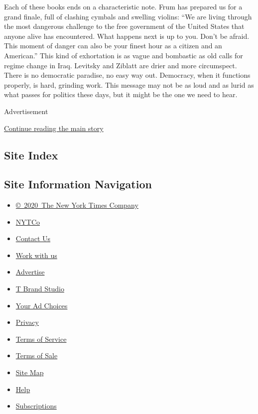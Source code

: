 Each of these books ends on a characteristic note. Frum has prepared us
for a grand finale, full of clashing cymbals and swelling violins: ``We
are living through the most dangerous challenge to the free government
of the United States that anyone alive has encountered. What happens
next is up to you. Don't be afraid. This moment of danger can also be
your finest hour as a citizen and an American.'' This kind of
exhortation is as vague and bombastic as old calls for regime change in
Iraq. Levitsky and Ziblatt are drier and more circumspect. There is no
democratic paradise, no easy way out. Democracy, when it functions
properly, is hard, grinding work. This message may not be as loud and as
lurid as what passes for politics these days, but it might be the one we
need to hear.

Advertisement

\protect\hyperlink{after-bottom}{Continue reading the main story}

\hypertarget{site-index}{%
\subsection{Site Index}\label{site-index}}

\hypertarget{site-information-navigation}{%
\subsection{Site Information
Navigation}\label{site-information-navigation}}

\begin{itemize}
\tightlist
\item
  \href{https://help.nytimes.com/hc/en-us/articles/115014792127-Copyright-notice}{©~2020~The
  New York Times Company}
\end{itemize}

\begin{itemize}
\tightlist
\item
  \href{https://www.nytco.com/}{NYTCo}
\item
  \href{https://help.nytimes.com/hc/en-us/articles/115015385887-Contact-Us}{Contact
  Us}
\item
  \href{https://www.nytco.com/careers/}{Work with us}
\item
  \href{https://nytmediakit.com/}{Advertise}
\item
  \href{http://www.tbrandstudio.com/}{T Brand Studio}
\item
  \href{https://www.nytimes.com/privacy/cookie-policy\#how-do-i-manage-trackers}{Your
  Ad Choices}
\item
  \href{https://www.nytimes.com/privacy}{Privacy}
\item
  \href{https://help.nytimes.com/hc/en-us/articles/115014893428-Terms-of-service}{Terms
  of Service}
\item
  \href{https://help.nytimes.com/hc/en-us/articles/115014893968-Terms-of-sale}{Terms
  of Sale}
\item
  \href{https://spiderbites.nytimes.com}{Site Map}
\item
  \href{https://help.nytimes.com/hc/en-us}{Help}
\item
  \href{https://www.nytimes.com/subscription?campaignId=37WXW}{Subscriptions}
\end{itemize}
